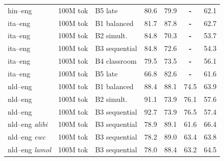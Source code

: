 \begin{table}[t]
\begin{tabular}{lll cc cc}
hin--eng  & 100M tok & B5 late & \cellcolor[rgb]{0.831,1.000,0.831} 80.6 & \cellcolor[rgb]{0.837,1.000,0.837} 79.9 & \textbf{-} & \cellcolor[rgb]{0.900,1.000,0.900} 62.1 \\
ita--eng & 100M tok & B1 balanced & \cellcolor[rgb]{0.825,1.000,0.825} 81.7 & \cellcolor[rgb]{0.794,1.000,0.794} 87.8 & \textbf{-} & \cellcolor[rgb]{0.895,1.000,0.895} 62.7 \\
ita--eng & 100M tok & B2 simult. & \cellcolor[rgb]{0.807,1.000,0.807} 84.8 & \cellcolor[rgb]{0.889,1.000,0.889} 70.3 & \textbf{-} & \cellcolor[rgb]{0.970,1.000,0.970} 53.7 \\
ita--eng & 100M tok & B3 sequential & \cellcolor[rgb]{0.807,1.000,0.807} 84.8 & \cellcolor[rgb]{0.877,1.000,0.877} 72.6 & \textbf{-} & \cellcolor[rgb]{0.965,1.000,0.965} 54.3 \\
ita--eng  & 100M tok & B4 classroom & \cellcolor[rgb]{0.837,1.000,0.837} 79.5 & \cellcolor[rgb]{0.872,1.000,0.872} 73.5 & \textbf{-} & \cellcolor[rgb]{0.950,1.000,0.950} 56.1 \\
ita--eng  & 100M tok & B5 late & \cellcolor[rgb]{0.907,1.000,0.907} 66.8 & \cellcolor[rgb]{0.822,1.000,0.822} 82.6 & \textbf{-} & \cellcolor[rgb]{0.905,1.000,0.905} 61.6 \\
nld--eng & 100M tok & B1 balanced & \cellcolor[rgb]{0.788,1.000,0.788} 88.4 & \cellcolor[rgb]{0.792,1.000,0.792} 88.1 & \cellcolor[rgb]{0.826,1.000,0.826} 74.5 & \cellcolor[rgb]{0.886,1.000,0.886} 63.9 \\
nld--eng & 100M tok & B2 simult. & \cellcolor[rgb]{0.773,1.000,0.773} 91.1 & \cellcolor[rgb]{0.870,1.000,0.870} 73.9 & \cellcolor[rgb]{0.815,1.000,0.815} 76.1 & \cellcolor[rgb]{0.937,1.000,0.937} 57.6 \\
nld--eng & 100M tok & B3 sequential & \cellcolor[rgb]{0.764,1.000,0.764} 92.7 & \cellcolor[rgb]{0.870,1.000,0.870} 73.9 & \cellcolor[rgb]{0.812,1.000,0.812} 76.5 & \cellcolor[rgb]{0.939,1.000,0.939} 57.4 \\
nld--eng {\scriptsize\textit{alibi}} & 100M tok & B3 sequential & \cellcolor[rgb]{0.840,1.000,0.840} 78.9 & \cellcolor[rgb]{0.787,1.000,0.787} 89.1 & \cellcolor[rgb]{0.918,1.000,0.918} 61.6 & \cellcolor[rgb]{0.865,1.000,0.865} 66.4 \\
nld--eng {\scriptsize\textit{ewc}} & 100M tok & B3 sequential & \cellcolor[rgb]{0.844,1.000,0.844} 78.2 & \cellcolor[rgb]{0.787,1.000,0.787} 89.0 & \cellcolor[rgb]{0.905,1.000,0.905} 63.4 & \cellcolor[rgb]{0.886,1.000,0.886} 63.8 \\
nld--eng {\scriptsize\textit{lamol}} & 100M tok & B3 sequential & \cellcolor[rgb]{0.845,1.000,0.845} 78.0 & \cellcolor[rgb]{0.791,1.000,0.791} 88.4 & \cellcolor[rgb]{0.906,1.000,0.906} 63.2 & \cellcolor[rgb]{0.881,1.000,0.881} 64.5 \\

\end{tabular}
\end{table}
